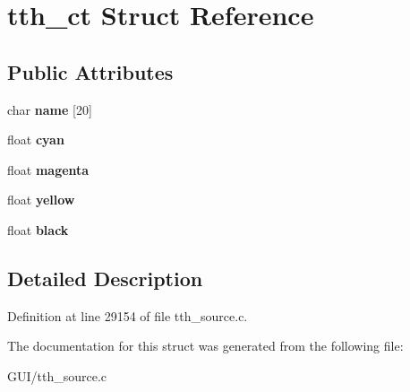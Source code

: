 \hypertarget{structtth__ct}{}\section{tth\+\_\+ct Struct Reference}
\label{structtth__ct}
\subsection*{Public Attributes}
\begin{DoxyCompactItemize}
\item 
\mbox{\label{structtth__ct_a384bf43203e7f1168567bfc207e445e6}} 
char {\bfseries name} \mbox{[}20\mbox{]}
\item 
\mbox{\label{structtth__ct_ac4799663b69317db70c18f33362ff61c}} 
float {\bfseries cyan}
\item 
\mbox{\label{structtth__ct_ab27446fa3e7ae2a5786e06816ac9677f}} 
float {\bfseries magenta}
\item 
\mbox{\label{structtth__ct_afc280fb870631ef6e5d1c6c4777b96e3}} 
float {\bfseries yellow}
\item 
\mbox{\label{structtth__ct_a25add5530be173825e061a14feb33ac0}} 
float {\bfseries black}
\end{DoxyCompactItemize}


\subsection{Detailed Description}


Definition at line 29154 of file tth\+\_\+source.\+c.



The documentation for this struct was generated from the following file\+:\begin{DoxyCompactItemize}
\item 
G\+U\+I/tth\+\_\+source.\+c\end{DoxyCompactItemize}
